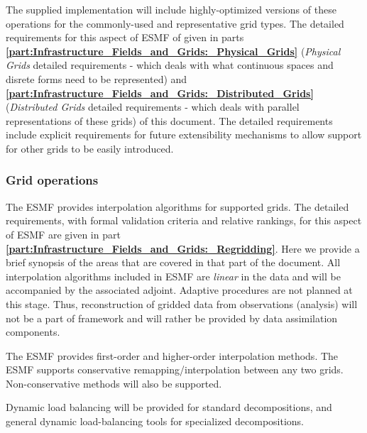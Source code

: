 The supplied implementation will include highly-optimized versions of
these operations for the commonly-used and representative grid types. The detailed 
requirements for this aspect of ESMF of given in parts 
{\bf \ref{part:Infrastructure_Fields_and_Grids:_Physical_Grids} } ({\it Physical Grids}
detailed requirements - which deals with what continuous spaces and disrete forms
need to be represented) and 
{\bf \ref{part:Infrastructure_Fields_and_Grids:_Distributed_Grids} } 
({\it Distributed Grids} detailed requirements - which deals with parallel representations
of these grids)
of this document.
The detailed requirements include explicit requirements for future extensibility mechanisms to allow
support for other grids to be easily introduced.

\subsubsection{Grid operations}

The ESMF provides interpolation algorithms for supported grids.  
The detailed requirements, with formal validation criteria
and relative rankings, for this aspect of ESMF are given
in part {\bf \ref{part:Infrastructure_Fields_and_Grids:_Regridding}}.
Here we provide a brief synopsis of the areas that are covered
in that part of the document.
All interpolation algorithms included in ESMF are {\it linear} in the data
and will be accompanied by the associated adjoint.  Adaptive
procedures are not planned at this stage. Thus, reconstruction of
gridded data from observations (analysis) will not be a part of
framework and will rather be provided by data assimilation components.

The ESMF provides first-order and higher-order interpolation 
methods.  The ESMF supports conservative remapping/interpolation 
between any two grids. Non-conservative methods will also 
be supported.

Dynamic load balancing will be provided for standard decompositions, 
and general dynamic load-balancing tools for specialized decompositions.

